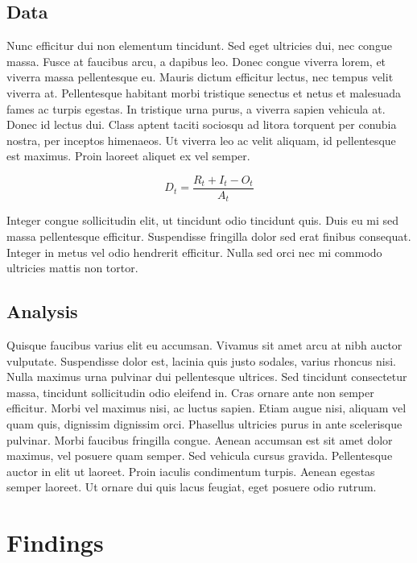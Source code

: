 \documentclass[12pt,letterpaper]{article} %
\begin{document}
\subsection{Data}

Nunc efficitur dui non elementum tincidunt. Sed eget ultricies dui, nec congue massa. Fusce at faucibus arcu, a dapibus leo. Donec congue viverra lorem, et viverra massa pellentesque eu. Mauris dictum efficitur lectus, nec tempus velit viverra at. Pellentesque habitant morbi tristique senectus et netus et malesuada fames ac turpis egestas. In tristique urna purus, a viverra sapien vehicula at. Donec id lectus dui. Class aptent taciti sociosqu ad litora torquent per conubia nostra, per inceptos himenaeos. Ut viverra leo ac velit aliquam, id pellentesque est maximus. Proin laoreet aliquet ex vel semper.

\begin{equation}
    \label{eq:my_equation}
    D_t = \frac{R_t + I_t - O_t}{A_t}
\end{equation}

Integer congue sollicitudin elit, ut tincidunt odio tincidunt quis. Duis eu mi sed massa pellentesque efficitur. Suspendisse fringilla dolor sed erat finibus consequat. Integer in metus vel odio hendrerit efficitur. Nulla sed orci nec mi commodo ultricies mattis non tortor.

\subsection{Analysis}

Quisque faucibus varius elit eu accumsan. Vivamus sit amet arcu at nibh auctor vulputate. Suspendisse dolor est, lacinia quis justo sodales, varius rhoncus nisi. Nulla maximus urna pulvinar dui pellentesque ultrices. Sed tincidunt consectetur massa, tincidunt sollicitudin odio eleifend in. Cras ornare ante non semper efficitur. Morbi vel maximus nisi, ac luctus sapien. Etiam augue nisi, aliquam vel quam quis, dignissim dignissim orci. Phasellus ultricies purus in ante scelerisque pulvinar. Morbi faucibus fringilla congue. Aenean accumsan est sit amet dolor maximus, vel posuere quam semper. Sed vehicula cursus gravida. Pellentesque auctor in elit ut laoreet. Proin iaculis condimentum turpis. Aenean egestas semper laoreet. Ut ornare dui quis lacus feugiat, eget posuere odio rutrum.

\section{Findings}
\end{document}
